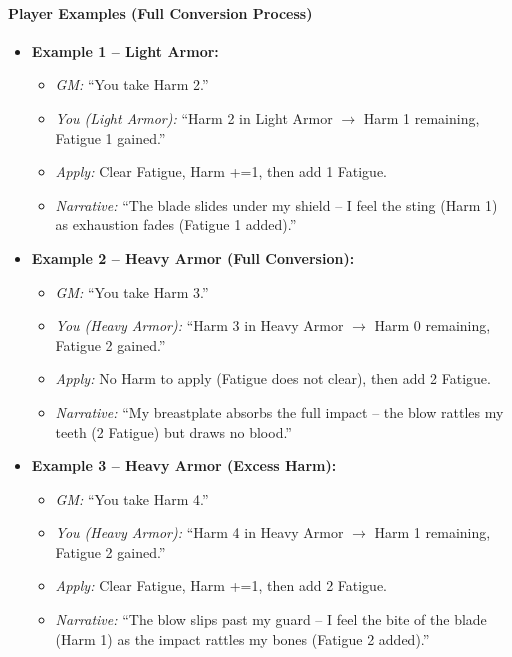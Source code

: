 \paragraph{Player Examples (Full Conversion Process)}
\begin{itemize}
  \item \textbf{Example 1 -- Light Armor:}
        \begin{itemize}
          \item \textit{GM:} ``You take Harm 2.''
          \item \textit{You (Light Armor):} ``Harm 2 in Light Armor $\to$ Harm 1 remaining, Fatigue 1 gained.''
          \item \textit{Apply:} Clear Fatigue, Harm +=1, then add 1 Fatigue.
          \item \textit{Narrative:} ``The blade slides under my shield -- I feel the sting (Harm 1) as exhaustion fades (Fatigue 1 added).''
        \end{itemize}

  \item \textbf{Example 2 -- Heavy Armor (Full Conversion):}
        \begin{itemize}
          \item \textit{GM:} ``You take Harm 3.''
          \item \textit{You (Heavy Armor):} ``Harm 3 in Heavy Armor $\to$ Harm 0 remaining, Fatigue 2 gained.''
          \item \textit{Apply:} No Harm to apply (Fatigue does not clear), then add 2 Fatigue.
          \item \textit{Narrative:} ``My breastplate absorbs the full impact -- the blow rattles my teeth (2 Fatigue) but draws no blood.''
        \end{itemize}

  \item \textbf{Example 3 -- Heavy Armor (Excess Harm):}
        \begin{itemize}
          \item \textit{GM:} ``You take Harm 4.''
          \item \textit{You (Heavy Armor):} ``Harm 4 in Heavy Armor $\to$ Harm 1 remaining, Fatigue 2 gained.''
          \item \textit{Apply:} Clear Fatigue, Harm +=1, then add 2 Fatigue.
          \item \textit{Narrative:} ``The blow slips past my guard -- I feel the bite of the blade (Harm 1) as the impact rattles my bones (Fatigue 2 added).''
        \end{itemize}


\end{itemize}
